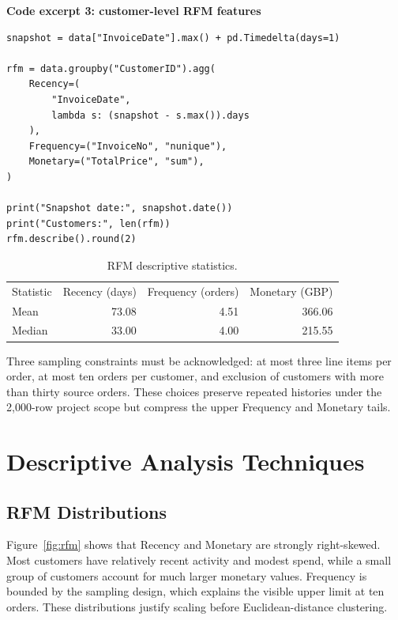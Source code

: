 \documentclass[11pt,a4paper]{article}
\begin{document}
\textbf{Code excerpt 3: customer-level RFM features}
\begin{lstlisting}[style=pythonshot]
snapshot = data["InvoiceDate"].max() + pd.Timedelta(days=1)

rfm = data.groupby("CustomerID").agg(
    Recency=(
        "InvoiceDate",
        lambda s: (snapshot - s.max()).days
    ),
    Frequency=("InvoiceNo", "nunique"),
    Monetary=("TotalPrice", "sum"),
)

print("Snapshot date:", snapshot.date())
print("Customers:", len(rfm))
rfm.describe().round(2)
\end{lstlisting}

\begin{table}[H]
\centering
\caption{RFM descriptive statistics.}\label{tab:rfmstats}
\begin{tabular}{lrrr}
\rowcolor{bcuBlue}\color{white}Statistic & \color{white}Recency (days) & \color{white}Frequency (orders) & \color{white}Monetary (GBP)\\
Mean & 73.08 & 4.51 & 366.06\\
Median & 33.00 & 4.00 & 215.55\\
\end{tabular}
\end{table}

Three sampling constraints must be acknowledged: at most three line items per order, at most ten orders per customer, and exclusion of customers with more than thirty source orders. These choices preserve repeated histories under the 2,000-row project scope but compress the upper Frequency and Monetary tails.
\clearpage

\clearpage
\section{Descriptive Analysis Techniques}
\subsection{RFM Distributions}
Figure~\ref{fig:rfm} shows that Recency and Monetary are strongly right-skewed. Most customers have relatively recent activity and modest spend, while a small group of customers account for much larger monetary values. Frequency is bounded by the sampling design, which explains the visible upper limit at ten orders. These distributions justify scaling before Euclidean-distance clustering.
\end{document}
